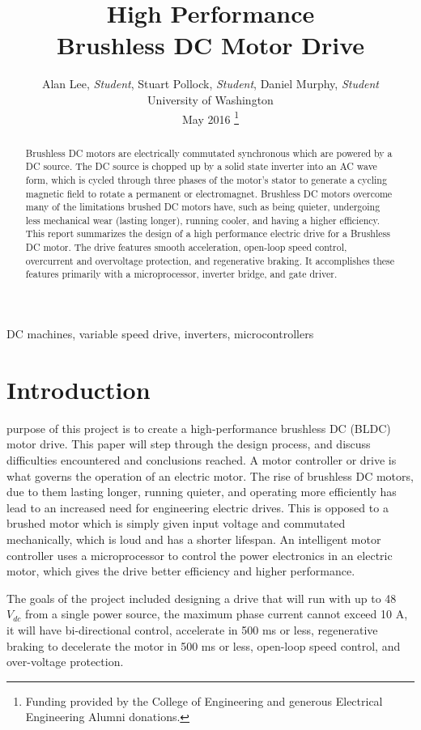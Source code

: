 \documentclass[journal,10pt]{IEEEtran}
\title{High Performance \\ Brushless DC Motor Drive}
\author{Alan Lee,\textit{ Student}, Stuart Pollock, \textit{Student}, Daniel Murphy, \textit{Student} \\University of Washington \\ May 2016 
    \thanks{Funding provided by the College of Engineering and generous Electrical Engineering Alumni donations.}
    }
\begin{document}
    \maketitle
    
\begin{abstract}
Brushless DC motors are electrically commutated synchronous which are powered by a DC source. The DC source is chopped up by a solid state inverter into an AC wave form, which is cycled through three phases of the motor’s stator to generate a cycling magnetic field to rotate a permanent or electromagnet. Brushless DC motors overcome many of the limitations brushed DC motors have, such as being quieter, undergoing less mechanical wear (lasting longer), running cooler, and having a higher efficiency. This report summarizes the design of a high performance electric drive for a Brushless DC motor. The drive features smooth acceleration, open-loop speed control, overcurrent and overvoltage protection, and regenerative braking. It accomplishes these features primarily with a microprocessor, inverter bridge, and gate driver.
\end{abstract}

\begin{IEEEkeywords}
DC machines, variable speed drive, inverters, microcontrollers
\end{IEEEkeywords}

\section{Introduction}
 purpose of this project is to create a high-performance brushless DC (BLDC) motor drive. This paper will step through the design process, and discuss difficulties encountered and conclusions reached. A motor controller or drive is what governs the operation of an electric motor. The rise of brushless DC motors, due to them lasting longer, running quieter, and operating more efficiently has lead to an increased need for engineering electric drives. This is opposed to a brushed motor which is simply given input voltage and commutated mechanically, which is loud and has a shorter lifespan. An intelligent motor controller uses a microprocessor to control the power electronics in an electric motor, which gives the drive better efficiency and higher performance. 

The goals of the project included designing a drive that will run with up to 48 $V_{dc}$ from a single power source, the maximum phase current cannot exceed 10 A, it will have bi-directional control, accelerate in 500 ms or less, regenerative braking to decelerate the motor in 500 ms or less, open-loop speed control, and over-voltage protection. 
\end{document}
